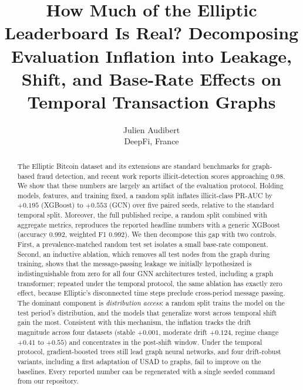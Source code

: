 \documentclass{article}
\title[How Much of the Elliptic Leaderboard Is Real?]{How Much of the Elliptic
Leaderboard Is Real? Decomposing Evaluation Inflation into Leakage, Shift, and
Base-Rate Effects on Temporal Transaction Graphs}
\author[Audibert]{%
Julien Audibert\\
DeepFi, France\\
\email{ja@deepfi.io}
}
\begin{document}
\maketitle

\begin{abstract}
The Elliptic Bitcoin dataset and its extensions are standard benchmarks for
graph-based fraud detection, and recent work reports illicit-detection scores
approaching 0.98. We show that these numbers are largely an artifact of the
evaluation protocol. Holding models, features, and training fixed, a random split
inflates illicit-class PR-AUC by $+0.195$ (XGBoost) to $+0.553$ (GCN) over five
paired seeds, relative to the standard temporal split. Moreover, the full
published recipe, a random split combined with aggregate metrics, reproduces the
reported headline numbers with a generic XGBoost (accuracy 0.992, weighted F1
0.992). We then decompose this gap with two controls. First, a prevalence-matched
random test set isolates a small base-rate component. Second, an inductive
ablation, which removes all test nodes from the graph during training, shows that
the message-passing leakage we initially hypothesized is indistinguishable from
zero for all four GNN architectures tested, including a graph transformer;
repeated under the temporal protocol, the same ablation has exactly zero effect,
because Elliptic's disconnected time steps preclude cross-period message passing. The dominant component is
\emph{distribution access}: a random split trains the model on the test period's
distribution, and the models that generalize worst across temporal shift gain the
most. Consistent with this mechanism, the inflation tracks the drift
magnitude across four datasets (stable $+0.001$, moderate drift $+0.124$, regime
change $+0.41$ to $+0.55$) and concentrates in the post-shift window. Under the
temporal protocol, gradient-boosted trees still lead graph neural networks, and
four drift-robust variants, including a first adaptation of USAD to graphs, fail
to improve on the baselines. Every reported number can be regenerated with a
single seeded command from our repository.
\end{abstract}
\end{document}
